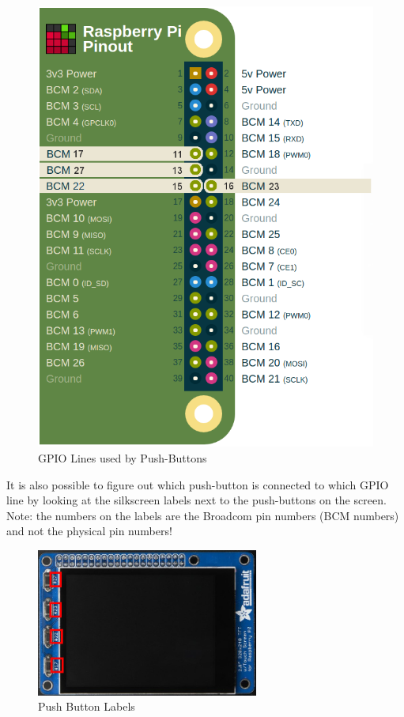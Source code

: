 \documentclass{article}
\begin{document}
	\begin{figure}[H]
		\centering
		\includegraphics[scale=0.3]{pics/PiTFT_2-8_Switches_GPIO.png}
		\caption{GPIO Lines used by Push-Buttons}
		\label{Push_buttons_GPIO}
	\end{figure}


It is also possible to figure out which push-button is connected to which GPIO line by looking at the silkscreen labels next to the push-buttons on the screen. Note: the numbers on the labels are the Broadcom pin numbers (BCM numbers) and not the physical pin numbers!



	\begin{figure}[H]
		\centering
		\includegraphics[width=0.65\textwidth]{pics/PiTFT_Plus_2_8_Overhead.jpg}
		\caption{Push Button Labels}
		\label{Push_Button_Labels}
	\end{figure}
\end{document}
